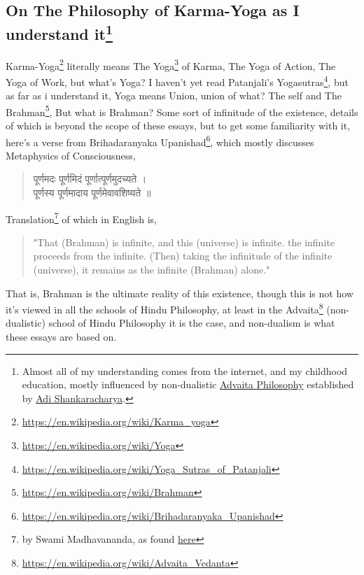 \documentclass[a4paper]{article}
\begin{document}
\subsection[On The Philosophy of Karma-Yoga as I understand it]{On The Philosophy of Karma-Yoga as I understand 
it\footnote{Almost all of my understanding comes from the internet, and my childhood education, mostly influenced by 
non-dualistic \href{https://en.wikipedia.org/wiki/Advaita\_Vedanta}{Advaita Philosophy} established by 
\href{https://en.wikipedia.org/wiki/Adi\_Shankara}{Adi Shankaracharya}.}}
Karma-Yoga\footnote{\href{https://en.wikipedia.org/wiki/Karma\_yoga}{https://en.wikipedia.org/wiki/Karma\_yoga}} 
literally means The Yoga\footnote{\href{https://en.wikipedia.org/wiki/Yoga}{https://en.wikipedia.org/wiki/Yoga}} of Karma, 
The Yoga of Action, The Yoga of Work, but what's Yoga? I haven't yet read Patanjali's 
Yogasutras\footnote{\href{https://en.wikipedia.org/wiki/Yoga\_Sutras\_of\_Patanjali}{https://en.wikipedia.org/wiki/Yoga\_Sutras\_of\_Patanjali}},
but as far as i understand it, Yoga means Union, union of what? The self and The 
Brahman\footnote{\href{https://en.wikipedia.org/wiki/Brahman}{https://en.wikipedia.org/wiki/Brahman}}, 
But what is Brahman? Some sort of infinitude of the existence, details of which is beyond the scope of these essays, 
but to get some familiarity with it, here's a verse from Brihadaranyaka 
Upanishad\footnote{\href{https://en.wikipedia.org/wiki/Brihadaranyaka\_Upanishad}{https://en.wikipedia.org/wiki/Brihadaranyaka\_Upanishad}}, 
which mostly discusses Metaphysics of Consciousness,
\begin{quote}
    \begin{sanskrit}
        पूर्णमदः पूर्णमिदं पूर्णात्पूर्णमुदच्यते ।
    \\ पूर्णस्य पूर्णमादाय पूर्णमेवावशिष्यते ॥
    \end{sanskrit}
\end{quote}
Translation\footnote{by Swami Madhavananda, as found \href{https://en.wikipedia.org/wiki/Brihadaranyaka\_Upanishad\#:\~:text=\%22That\%20(Brahman)\%20is,infinite\%20(Brahman)\%20alone.\%22}{here}}
of which in English is,
\begin{quote}
"That (Brahman) is infinite, and this (universe) is infinite. the infinite proceeds from the infinite.
(Then) taking the infinitude of the infinite (universe), it remains as the infinite (Brahman) alone."
\end{quote}
That is, Brahman is the ultimate reality of this existence, though this is not how it's viewed in all
the schools of Hindu Philosophy, at least in the 
Advaita\footnote{\href{https://en.wikipedia.org/wiki/Advaita\_Vedanta}{https://en.wikipedia.org/wiki/Advaita\_Vedanta}} 
(non-dualistic) school of Hindu Philosophy it is the case, and non-dualism is what these essays are based on.
\end{document}
